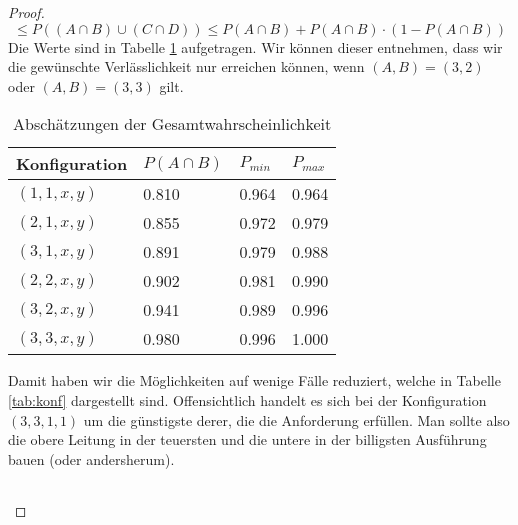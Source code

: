 \documentclass[a4paper]{scrartcl}
\begin{document}
\begin{enumerate}[label=\bfseries\arabic*.]
\begin{proof}
\begin{equation*}
                        \leq P((A \cap B) \cup (C \cap D))
                        \leq P(A \cap B) + P(A \cap B) \cdot (1 - P(A \cap B))
                    \end{equation*}
                    Die Werte sind in Tabelle \ref{tab:absch} aufgetragen.
                    Wir können dieser entnehmen, dass wir die gewünschte
                    Verlässlichkeit nur erreichen können, wenn
                    $(A, B) = (3, 2)$ oder $(A, B) = (3, 3)$ gilt.
                    \begin{table}[H]
                        \centering
                        \begin{tabular}{l|l|l|l}
                            Konfiguration & $P(A \cap B)$ & $P_{min}$ & $P_{max}$ \\
                            \hline
                            $(1, 1, x, y)$ & \num{0.810} & \num{0.964} & \num{0.964} \\
                            $(2, 1, x, y)$ & \num{0.855} & \num{0.972} & \num{0.979} \\
                            $(3, 1, x, y)$ & \num{0.891} & \num{0.979} & \num{0.988} \\
                            $(2, 2, x, y)$ & \num{0.902} & \num{0.981} & \num{0.990} \\
                            $(3, 2, x, y)$ & \num{0.941} & \num{0.989} & \num{0.996} \\
                            $(3, 3, x, y)$ & \num{0.980} & \num{0.996} & \num{1.000} \\%
                        \end{tabular}
                        \caption{Abschätzungen der Gesamtwahrscheinlichkeit}
                        \label{tab:absch}
                    \end{table}
                    Damit haben wir die Möglichkeiten auf wenige Fälle
                    reduziert, welche in Tabelle \ref{tab:konf} dargestellt
                    sind.
                    Offensichtlich handelt es sich bei der Konfiguration
                    $(3, 3, 1, 1)$ um die günstigste derer, die die Anforderung
                    erfüllen.
                    Man sollte also die obere Leitung in der teuersten und die
                    untere in der billigsten Ausführung bauen
                    (oder andersherum).
                    \begin{table}[H]
                        \centering
                        \begin{tabular}{l|l|l}

\end{tabular}
\end{table}
\end{proof}
\end{enumerate}
\end{document}
